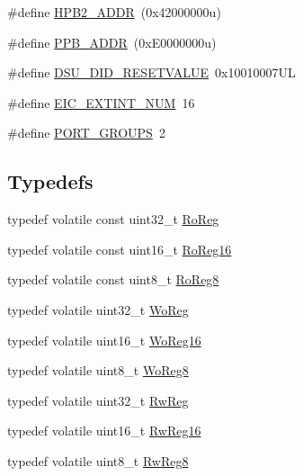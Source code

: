 \begin{DoxyCompactItemize}
\item 
\#define \mbox{\hyperlink{group___s_a_m_d21_g16_a__definitions_gaef42fa53ddf169a2a50be70d29f73571}{H\+P\+B2\+\_\+\+A\+D\+DR}}~(0x42000000u)
\item 
\#define \mbox{\hyperlink{group___s_a_m_d21_g16_a__definitions_ga8895d0a3a9a3126cc44330f86c8ce564}{P\+P\+B\+\_\+\+A\+D\+DR}}~(0x\+E0000000u)
\item 
\#define \mbox{\hyperlink{group___s_a_m_d21_g16_a__definitions_gada75131d542c9e1966238f5488f89bd6}{D\+S\+U\+\_\+\+D\+I\+D\+\_\+\+R\+E\+S\+E\+T\+V\+A\+L\+UE}}~0x10010007\+UL
\item 
\#define \mbox{\hyperlink{group___s_a_m_d21_g16_a__definitions_ga88ebc38c95506296f5d21f82476296ae}{E\+I\+C\+\_\+\+E\+X\+T\+I\+N\+T\+\_\+\+N\+UM}}~16
\item 
\#define \mbox{\hyperlink{group___s_a_m_d21_g16_a__definitions_gab9243ffe03a1dc631b57a495b4b3d467}{P\+O\+R\+T\+\_\+\+G\+R\+O\+U\+PS}}~2
\end{DoxyCompactItemize}
\subsection*{Typedefs}
\begin{DoxyCompactItemize}
\item 
typedef volatile const uint32\+\_\+t \mbox{\hyperlink{group___s_a_m_d21_g16_a__definitions_ga5d556f8391af4141be23f7334ac9dd68}{Ro\+Reg}}
\item 
typedef volatile const uint16\+\_\+t \mbox{\hyperlink{group___s_a_m_d21_g16_a__definitions_gaebf6e33c2d49a802e06e22a95ea9d0d0}{Ro\+Reg16}}
\item 
typedef volatile const uint8\+\_\+t \mbox{\hyperlink{group___s_a_m_d21_g16_a__definitions_ga0d957f1433aaf5d70e4dc2b68288442d}{Ro\+Reg8}}
\item 
typedef volatile uint32\+\_\+t \mbox{\hyperlink{group___s_a_m_d21_g16_a__definitions_gac0f96d4e8018367b38f527007cf0eafd}{Wo\+Reg}}
\item 
typedef volatile uint16\+\_\+t \mbox{\hyperlink{group___s_a_m_d21_g16_a__definitions_ga0ab0e5f6c8301aa1c2068e511d854094}{Wo\+Reg16}}
\item 
typedef volatile uint8\+\_\+t \mbox{\hyperlink{group___s_a_m_d21_g16_a__definitions_ga5e336e5a36ee12ebeafb021108e5275b}{Wo\+Reg8}}
\item 
typedef volatile uint32\+\_\+t \mbox{\hyperlink{group___s_a_m_d21_g16_a__definitions_gacf1496e3bbe303e55f627fc7558a68c7}{Rw\+Reg}}
\item 
typedef volatile uint16\+\_\+t \mbox{\hyperlink{group___s_a_m_d21_g16_a__definitions_gacce07556c80fc352ae607f225f19fed5}{Rw\+Reg16}}
\item 
typedef volatile uint8\+\_\+t \mbox{\hyperlink{group___s_a_m_d21_g16_a__definitions_gae361754be775bb192f85821d3ab33c17}{Rw\+Reg8}}
\end{DoxyCompactItemize}


